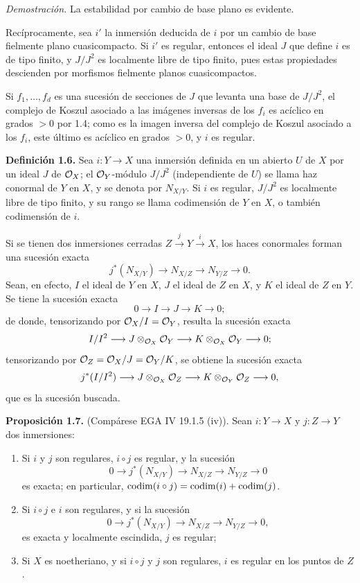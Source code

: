 \emph{Demostración.} La estabilidad por cambio de base plano es evidente.

Recíprocamente, sea $i'$ la inmersión deducida de $i$ por un cambio de base fielmente plano cuasicompacto. Si $i'$ es regular, entonces el ideal $J$ que define $i$ es de tipo finito, y $J/J^2$ es localmente libre de tipo finito, pues estas propiedades descienden por morfismos fielmente planos cuasicompactos.

Si $f_1,\ldots,f_d$ es una sucesión de secciones de $J$ que levanta una base de $J/J^2$, el complejo de Koszul asociado a las imágenes inversas de los $f_i$ es acíclico en grados $>0$ por 1.4; como es la imagen inversa del complejo de Koszul asociado a los $f_i$, este último es acíclico en grados $>0$, y $i$ es regular.

\textbf{Definición 1.6.} Sea $i:Y\longrightarrow X$ una inmersión definida en un abierto $U$ de $X$ por un ideal $J$ de $\mathcal O_X$; el $\mathcal O_Y$-módulo $J/J^2$ (independiente de $U$) se llama haz conormal de $Y$ en $X$, y se denota por $N_{X/Y}$. Si $i$ es regular, $J/J^2$ es localmente libre de tipo finito, y su rango se llama codimensión de $Y$ en $X$, o también codimensión de $i$.

Si se tienen dos inmersiones cerradas $Z\xrightarrow{j}Y\xrightarrow{i}X$, los haces conormales forman una sucesión exacta
\begin{equation}\tag{1.6.1}
 j^*(N_{X/Y})\longrightarrow N_{X/Z}\longrightarrow N_{Y/Z}\longrightarrow0.
\end{equation}
Sean, en efecto, $I$ el ideal de $Y$ en $X$, $J$ el ideal de $Z$ en $X$, y $K$ el ideal de $Z$ en $Y$. Se tiene la sucesión exacta
\[
0\longrightarrow I\longrightarrow J\longrightarrow K\longrightarrow0;
\]
de donde, tensorizando por $\mathcal O_X/I=\mathcal O_Y$, resulta la sucesión exacta
\[
 I/I^2\longrightarrow J\otimes_{\mathcal O_X}\mathcal O_Y\longrightarrow K\otimes_{\mathcal O_X}\mathcal O_Y\longrightarrow0;
\]
tensorizando por $\mathcal O_Z=\mathcal O_X/J=\mathcal O_Y/K$, se obtiene la sucesión exacta
\[
 j^*(I/I^2)\longrightarrow J\otimes_{\mathcal O_X}\mathcal O_Z\longrightarrow K\otimes_{\mathcal O_Y}\mathcal O_Z\longrightarrow0,
\]
que es la sucesión buscada.

\textbf{Proposición 1.7.} (Compárese EGA IV 19.1.5 (iv)). Sean $i:Y\longrightarrow X$ y $j:Z\longrightarrow Y$ dos inmersiones:
\begin{enumerate}[label=\roman*)]
\item Si $i$ y $j$ son regulares, $i\circ j$ es regular, y la sucesión
\[
0\longrightarrow j^*(N_{X/Y})\longrightarrow N_{X/Z}\longrightarrow N_{Y/Z}\longrightarrow0
\]
es exacta; en particular, $\operatorname{codim}(i\circ j)=\operatorname{codim}(i)+\operatorname{codim}(j)$.
\item Si $i\circ j$ e $i$ son regulares, y si la sucesión
\[
0\longrightarrow j^*(N_{X/Y})\longrightarrow N_{X/Z}\longrightarrow N_{Y/Z}\longrightarrow0,
\]
es exacta y localmente escindida, $j$ es regular;
\item Si $X$ es noetheriano, y si $i\circ j$ y $j$ son regulares, $i$ es regular en los puntos de $Z$.
\end{enumerate}

